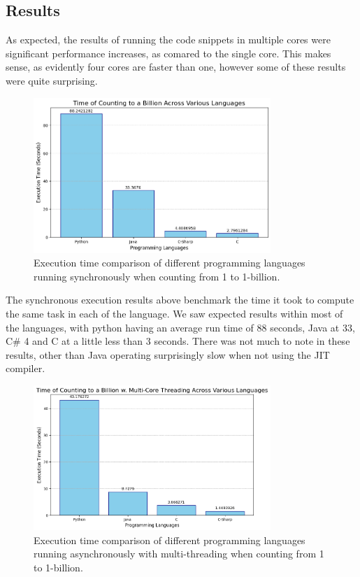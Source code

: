 \documentclass[12pt,a4paper]{article}
\begin{document}
\newpage
\subsection{Results}

As expected, the results of running the code snippets in multiple cores were significant performance increases, as comared to the single core. This makes sense, as evidently four cores are faster than one, however some of these results were quite surprising.

\begin{figure}[!htb]
    \centering
    \includegraphics[width=0.8\textwidth]{../sync_records/sync_exec_times.png}
    \captionsetup{font=tiny, justification=centering}
    \caption{Execution time comparison of different programming languages running synchronously when counting from 1 to 1-billion.}
    \label{fig:sync-exec-times}
\end{figure}


The synchronous execution results above benchmark the time it took to compute the same task in each of the language. We saw expected results within most of the languages, with python having an average run time of 88 seconds, Java at 33, C\# 4 and C at a little less than 3 seconds. There was not much to note in these results, other than Java operating surprisingly slow when not using the JIT compiler.


\begin{figure}[!htb]
    \centering
    \includegraphics[width=0.8\textwidth]{../async_records/async_exec_times.png}
    \captionsetup{font=tiny, justification=centering}
    \caption{Execution time comparison of different programming languages running asynchronously with multi-threading when counting from 1 to 1-billion.}
    \label{fig:async-exec-times}
\end{figure}
\end{document}
